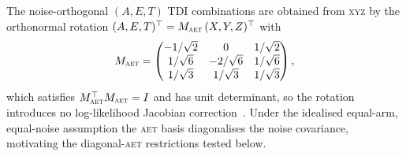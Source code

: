 \documentclass[%
	reprint,
	nofootinbib,
	amsmath,
	amssymb,
	aps,
]{revtex4-2}
\newcommand{\AET}{\textsc{aet}\xspace}
\newcommand{\XYZ}{\textsc{xyz}\xspace}
\begin{document}
	The noise-orthogonal $(A, E, T)$ TDI combinations are obtained from \XYZ by
	the orthonormal rotation $(A, E, T)^{\top} = M_{\AET}\,(X, Y, Z)^{\top}$
	with
	\begin{equation}
		\label{eq:M_AET}
		M_{\AET} = \begin{pmatrix}
			-1/\sqrt{2} & 0 & 1/\sqrt{2} \\
			1/\sqrt{6} & -2/\sqrt{6} & 1/\sqrt{6} \\
			1/\sqrt{3} & 1/\sqrt{3} & 1/\sqrt{3}
		\end{pmatrix},
	\end{equation}
	which satisfies $M_{\AET}^{\top}M_{\AET} = I$ and has unit
	determinant, so the rotation introduces no log-likelihood Jacobian
	correction~\cite{prince2002_LISA_optimal_sensitivity}. Under the
	idealised equal-arm, equal-noise assumption the \AET basis diagonalises
	the noise covariance, motivating the diagonal-\AET restrictions tested
	below.
\end{document}
